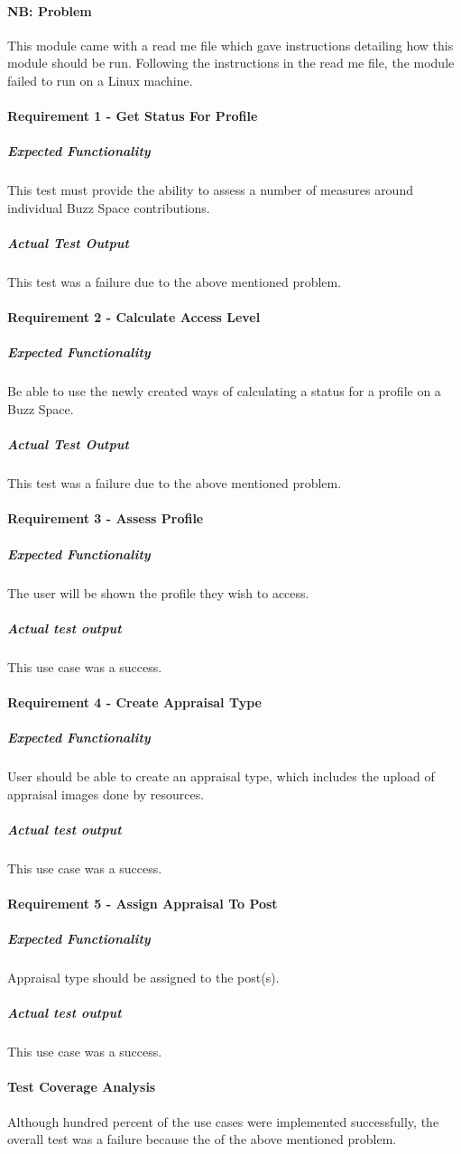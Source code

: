 \paragraph{NB: Problem}
	This module came with a read me file which gave instructions detailing how this module should be run.
	Following the instructions in the read me file, the module failed to run on a Linux machine. 
	
\paragraph{Requirement 1 - Get Status For Profile}  
	\subparagraph{Expected Functionality}
	This test must provide the ability to assess a number of measures around individual Buzz Space contributions.
	
	\subparagraph{Actual Test Output}
	This test was a failure due to the above mentioned problem.

\paragraph{Requirement 2 - Calculate Access Level}
	\subparagraph{Expected Functionality}
	Be able to use the newly created ways of calculating a status for a profile on a Buzz Space.
	
	\subparagraph{Actual Test Output}
	 This test was a failure due to the above mentioned problem.

\paragraph{Requirement 3 - Assess Profile}
 	\subparagraph{Expected Functionality}
	The user will be shown the profile they wish to access.	
	\subparagraph{Actual test output}
	This use case was a success.
	
\paragraph{Requirement 4 - Create Appraisal Type}
	\subparagraph{Expected Functionality}
	User should be able to create an appraisal type, which includes the upload of appraisal images done by resources.	
	\subparagraph{Actual test output}
	This use case was a success.

\paragraph{Requirement 5 - Assign Appraisal To Post}
	\subparagraph{Expected Functionality}
	Appraisal type should be assigned to the post(s).
	\subparagraph{Actual test output}
	This use case was a success.
	
\paragraph{Test Coverage Analysis}
	Although hundred percent of the use cases were implemented successfully, the overall test was a failure because
	the of the above mentioned problem.

	
